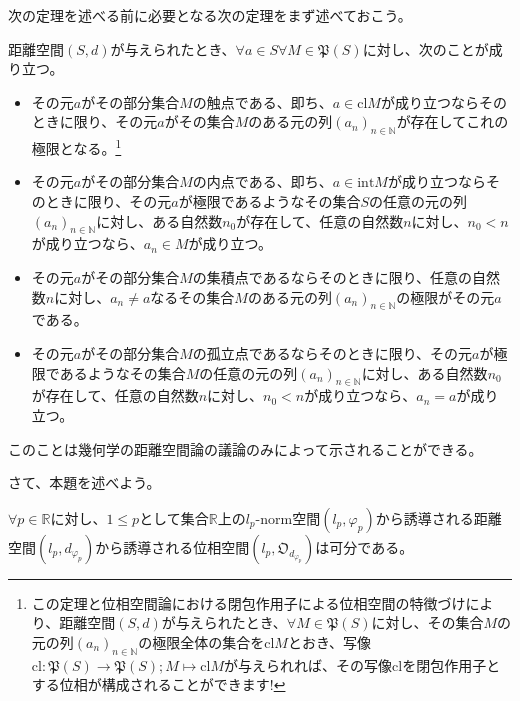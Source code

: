\documentclass[dvipdfmx]{jsarticle}
\begin{document}
次の定理を述べる前に必要となる次の定理をまず述べておこう。
\begin{thm}[距離空間の極限による特徴づけ]
距離空間$(S,d)$が与えられたとき、$\forall a \in S\forall M \in \mathfrak{P}(S)$に対し、次のことが成り立つ。
\begin{itemize}
\item
  その元$a$がその部分集合$M$の触点である、即ち、$a \in {\mathrm{cl}}M$が成り立つならそのときに限り、その元$a$がその集合$M$のある元の列$\left( a_{n} \right)_{n \in \mathbb{N}}$が存在してこれの極限となる。\footnote{この定理と位相空間論における閉包作用子による位相空間の特徴づけにより、距離空間$(S,d)$が与えられたとき、$\forall M \in \mathfrak{P}(S)$に対し、その集合$M$の元の列$\left( a_{n} \right)_{n \in \mathbb{N}}$の極限全体の集合を${\mathrm{cl}}M$とおき、写像$\mathrm{cl}\mathfrak{:P}(S)\mathfrak{\rightarrow P}(S);M \mapsto {\mathrm{cl}}M$が与えられれば、その写像$\mathrm{cl}$を閉包作用子とする位相が構成されることができます! }
\item
  その元$a$がその部分集合$M$の内点である、即ち、$a \in \mathrm{int}M$が成り立つならそのときに限り、その元$a$が極限であるようなその集合$S$の任意の元の列$\left( a_{n} \right)_{n \in \mathbb{N}}$に対し、ある自然数$n_{0}$が存在して、任意の自然数$n$に対し、$n_{0} < n$が成り立つなら、$a_{n} \in M$が成り立つ。
\item
  その元$a$がその部分集合$M$の集積点であるならそのときに限り、任意の自然数$n$に対し、$a_{n} \neq a$なるその集合$M$のある元の列$\left( a_{n} \right)_{n \in \mathbb{N}}$の極限がその元$a$である。
\item
  その元$a$がその部分集合$M$の孤立点であるならそのときに限り、その元$a$が極限であるようなその集合$M$の任意の元の列$\left( a_{n} \right)_{n \in \mathbb{N}}$に対し、ある自然数$n_{0}$が存在して、任意の自然数$n$に対し、$n_{0} < n$が成り立つなら、$a_{n} = a$が成り立つ。
\end{itemize}
\end{thm}
このことは幾何学の距離空間論の議論のみによって示されることができる。\par
さて、本題を述べよう。
\begin{thm}\label{2.3.3.5}
$\forall p \in \mathbb{R}$に対し、$1 \leq p$として集合$\mathbb{R}$上の$l_{p}$-norm空間$\left( l_{p},\varphi_{p} \right)$から誘導される距離空間$\left( l_{p},d_{\varphi_{p}} \right)$から誘導される位相空間$\left( l_{p},\mathfrak{O}_{d_{\varphi_{p}}} \right)$は可分である。
\end{thm}
\end{document}
